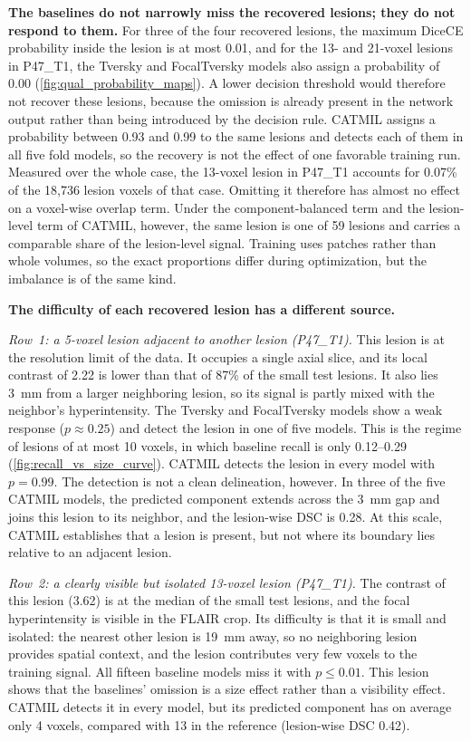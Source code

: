 \textbf{The baselines do not narrowly miss the recovered lesions; they do
not respond to them.} For three of the four recovered lesions, the maximum
DiceCE probability inside the lesion is at most 0.01, and for the 13- and
21-voxel lesions in P47\_T1, the Tversky and FocalTversky models also
assign a probability of 0.00 (\cref{fig:qual_probability_maps}). A lower
decision threshold would therefore not recover these lesions, because the
omission is already present in the network output rather than being
introduced by the decision rule. CATMIL assigns a probability between 0.93
and 0.99 to the same lesions and detects each of them in all five fold
models, so the recovery is not the effect of one favorable training run.
Measured over the whole case, the 13-voxel lesion in P47\_T1 accounts for
0.07\% of the 18,736 lesion voxels of that case. Omitting it therefore has
almost no effect on a voxel-wise overlap term. Under the component-balanced
term and the lesion-level term of CATMIL, however, the same lesion is one
of 59 lesions and carries a comparable share of the lesion-level signal.
Training uses patches rather than whole volumes, so the exact proportions
differ during optimization, but the imbalance is of the same kind.

\textbf{The difficulty of each recovered lesion has a different source.}

\emph{Row~1: a 5-voxel lesion adjacent to another lesion (P47\_T1).} This
lesion is at the resolution limit of the data. It occupies a single axial
slice, and its local contrast of 2.22 is lower than that of 87\% of the
small test lesions. It also lies 3~mm from a larger neighboring lesion, so
its signal is partly mixed with the neighbor's hyperintensity. The Tversky
and FocalTversky models show a weak response ($p \approx 0.25$) and detect
the lesion in one of five models. This is the regime of lesions of at most
10 voxels, in which baseline recall is only 0.12--0.29
(\cref{fig:recall_vs_size_curve}). CATMIL detects the lesion in every model
with $p = 0.99$. The detection is not a clean delineation, however. In
three of the five CATMIL models, the predicted component extends across the
3~mm gap and joins this lesion to its neighbor, and the lesion-wise DSC is
0.28. At this scale, CATMIL establishes that a lesion is present, but not
where its boundary lies relative to an adjacent lesion.

\emph{Row~2: a clearly visible but isolated 13-voxel lesion (P47\_T1).} The
contrast of this lesion (3.62) is at the median of the small test lesions,
and the focal hyperintensity is visible in the FLAIR crop. Its difficulty
is that it is small and isolated: the nearest other lesion is 19~mm away,
so no neighboring lesion provides spatial context, and the lesion
contributes very few voxels to the training signal. All fifteen baseline
models miss it with $p \leq 0.01$. This lesion shows that the baselines'
omission is a size effect rather than a visibility effect. CATMIL detects
it in every model, but its predicted component has on average only 4
voxels, compared with 13 in the reference (lesion-wise DSC 0.42).

